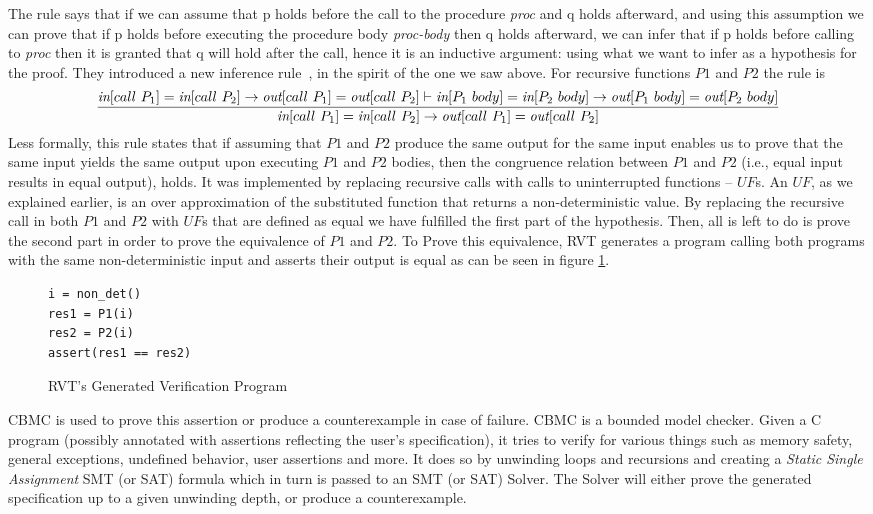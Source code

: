 The rule says that if we can assume that {p} holds before the call to the procedure \emph{proc} and {q} holds afterward, and using this assumption we can prove that if {p} holds before executing the procedure body \emph{proc-body} then {q} holds afterward, we can infer that if {p} holds before calling to \emph{proc} then it is granted that {q} will hold after the call, hence it is an inductive argument: using what we want to infer as a hypothesis for the proof. They introduced a new inference rule~\cite{DBLP:conf/dac/GodlinS09}, in the spirit of the one we saw above. For recursive functions $P1$ and $P2$ the rule is
\begin{equation}
 {\frac {{\emph{in}[call\ P_1]=\emph{in}[call\ P_2]\rightarrow \emph{out}[call\ P_1]=\emph{out}[call\ P_2]} \vdash{\emph{in}[P_1\ body]=\emph{in}[P_2\ body]\rightarrow \emph{out}[P_1\ body]=\emph{out}[P_2\ body]} }
{{\emph{in}[call\ P_1]=\emph{in}[call\ P_2]\rightarrow \emph{out}[call\ P_1]=\emph{out}[call\ P_2]}}} 
\end{equation}
Less formally, this rule states that if  assuming that $P1$ and $P2$ produce the same output for the same input enables us to prove that the same input yields the same output upon executing $P1$ and $P2$ bodies, then the congruence relation between $P1$ and $P2$ (i.e., equal input results in equal output), holds. It was implemented by replacing recursive calls with calls to uninterrupted functions – $UF$s. An $UF$, as we explained earlier, is an over approximation of the substituted function that returns a non-deterministic value. By replacing the recursive call in both $P1$ and $P2$ with $UF$s that are defined as equal we have fulfilled the first part of the hypothesis. Then, all is left to do is prove the second part in order to prove the equivalence of $P1$ and $P2$. To Prove this equivalence, RVT generates a program calling both programs with the same non-deterministic input and asserts their output is equal as can be seen in figure \ref{fig:rvtmainprogram}.
\begin{figure}[h]
\begin{center}
\begin{minipage}{7 cm}

\begin{lstlisting}
i = non_det()
res1 = P1(i)
res2 = P2(i)
assert(res1 == res2) 
\end{lstlisting}
\end{minipage}
\caption{RVT's Generated Verification Program}
\label{fig:rvtmainprogram}
\end{center}
\end{figure}
CBMC is used to prove this assertion or produce a counterexample in case of failure. CBMC is a bounded model checker. Given a C program (possibly annotated with assertions reflecting the user's specification), it tries to verify for various things such as memory safety, general exceptions, undefined behavior, user assertions and more. It does so by unwinding loops and recursions and creating a \emph{Static Single Assignment} SMT (or SAT) formula which in turn is passed to an SMT (or SAT) Solver. The Solver will either prove the generated specification up to a given unwinding depth, or produce a counterexample. 

